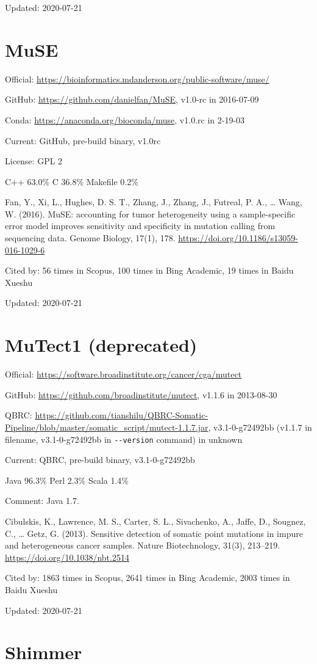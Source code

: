 \documentclass[]{article}
\newcommand{\cb}[3]{\par Cited by: {\color{blue}\Huge #1} times in Scopus, {\color{blue}\Huge #2} times in Bing Academic, {\color{blue}\Huge #3} times in Baidu Xueshu}
\begin{document}
Updated: 2020-07-21

\section{MuSE}

Official: \url{https://bioinformatics.mdanderson.org/public-software/muse/}

GitHub: \url{https://github.com/danielfan/MuSE}, v1.0-rc in 2016-07-09

Conda: \url{https://anaconda.org/bioconda/muse}, v1.0.rc in 2-19-03

Current: GitHub, pre-build binary, v1.0rc

License: GPL 2

C++ 63.0\% C 36.8\% Makefile 0.2\%

Fan, Y., Xi, L., Hughes, D. S. T., Zhang, J., Zhang, J., Futreal, P. A., … Wang, W. (2016). MuSE: accounting for tumor heterogeneity using a sample-specific error model improves sensitivity and specificity in mutation calling from sequencing data. Genome Biology, 17(1), 178. \url{https://doi.org/10.1186/s13059-016-1029-6}\cb{56}{100}{19}

Updated: 2020-07-21

\section{MuTect1 (deprecated)}

Official: \url{https://software.broadinstitute.org/cancer/cga/mutect}

GitHub: \url{https://github.com/broadinstitute/mutect}, v1.1.6 in 2013-08-30

QBRC: \url{https://github.com/tianshilu/QBRC-Somatic-Pipeline/blob/master/somatic_script/mutect-1.1.7.jar}, v3.1-0-g72492bb (v1.1.7 in filename, v3.1-0-g72492bb in \verb|--version| command) in unknown

Current: QBRC, pre-build binary, v3.1-0-g72492bb

Java 96.3\% Perl 2.3\% Scala 1.4\%

Comment: Java 1.7.

Cibulskis, K., Lawrence, M. S., Carter, S. L., Sivachenko, A., Jaffe, D., Sougnez, C., … Getz, G. (2013). Sensitive detection of somatic point mutations in impure and heterogeneous cancer samples. Nature Biotechnology, 31(3), 213–219. \url{https://doi.org/10.1038/nbt.2514}\cb{1863}{2641}{2003}

Updated: 2020-07-21

\section{Shimmer}
\end{document}
